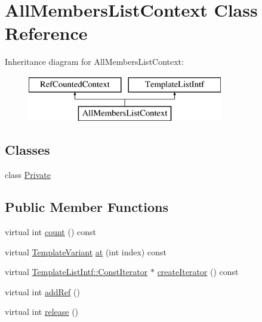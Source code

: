 \hypertarget{class_all_members_list_context}{}\section{All\+Members\+List\+Context Class Reference}
\label{class_all_members_list_context}
Inheritance diagram for All\+Members\+List\+Context\+:\begin{figure}[H]
\begin{center}
\leavevmode
\includegraphics[height=2.000000cm]{class_all_members_list_context}
\end{center}
\end{figure}
\subsection*{Classes}
\begin{DoxyCompactItemize}
\item 
class \mbox{\hyperlink{class_all_members_list_context_1_1_private}{Private}}
\end{DoxyCompactItemize}
\subsection*{Public Member Functions}
\begin{DoxyCompactItemize}
\item 
virtual int \mbox{\hyperlink{class_all_members_list_context_acf212002a620916c1d075acbdf3e1eba}{count}} () const
\item 
virtual \mbox{\hyperlink{class_template_variant}{Template\+Variant}} \mbox{\hyperlink{class_all_members_list_context_a0dc11cc3fddb12437e37fd350e94bd72}{at}} (int index) const
\item 
virtual \mbox{\hyperlink{class_template_list_intf_1_1_const_iterator}{Template\+List\+Intf\+::\+Const\+Iterator}} $\ast$ \mbox{\hyperlink{class_all_members_list_context_a9ae93051de2e2e40707514c17e6f44f6}{create\+Iterator}} () const
\item 
virtual int \mbox{\hyperlink{class_all_members_list_context_ac1944fc9ad154caa5ed58e28f49c2461}{add\+Ref}} ()
\item 
virtual int \mbox{\hyperlink{class_all_members_list_context_a7b3690135afdc30e9e6f3e2dbb9265cc}{release}} ()
\end{DoxyCompactItemize}
